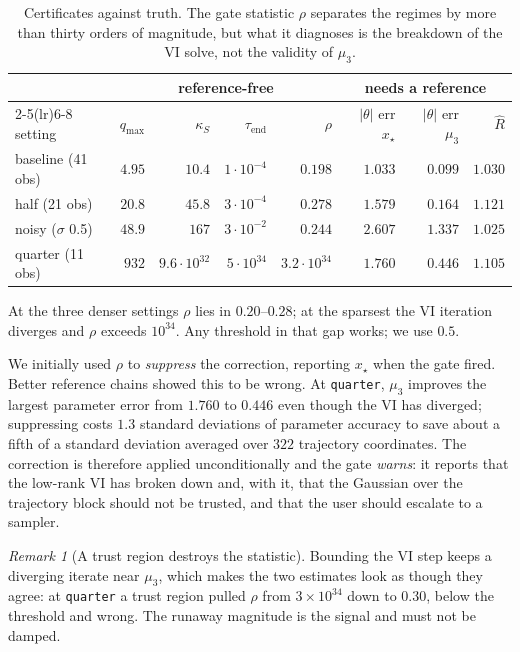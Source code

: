 \documentclass[11pt]{article}
\newcommand{\xmap}{x_{\star}}
\newcommand{\code}[1]{\texttt{\small #1}}
\newcommand{\Rhat}{\widehat{R}}
\theoremstyle{plain}
\theoremstyle{definition}
\theoremstyle{remark}
\newtheorem{remark}{Remark}
\begin{document}
\begin{table}[t]
\centering
\small
\begin{tabular}{lrrrr@{\hskip 1.2em}rrr}
\toprule
& \multicolumn{4}{c}{reference-free} & \multicolumn{3}{c}{needs a reference} \\
\cmidrule(lr){2-5}\cmidrule(lr){6-8}
setting & $q_{\max}$ & $\kappa_S$ & $\tau_{\text{end}}$ & $\rho$
        & $|\theta|$ err $\xmap$ & $|\theta|$ err $\mu_3$ & $\Rhat$ \\
\midrule
baseline (41 obs)   & $4.95$  & $10.4$    & $1{\cdot}10^{-4}$ & $0.198$ & $1.033$ & $0.099$ & $1.030$\\
half (21 obs)       & $20.8$  & $45.8$    & $3{\cdot}10^{-4}$ & $0.278$ & $1.579$ & $0.164$ & $1.121$\\
noisy ($\sigma$ 0.5)& $48.9$  & $167$     & $3{\cdot}10^{-2}$ & $0.244$ & $2.607$ & $1.337$ & $1.025$\\
quarter (11 obs)    & $932$   & $9.6{\cdot}10^{32}$ & $5{\cdot}10^{34}$ & $3.2{\cdot}10^{34}$ & $1.760$ & $0.446$ & $1.105$\\
\bottomrule
\end{tabular}
\caption{Certificates against truth. The gate statistic $\rho$ separates the regimes by more than
thirty orders of magnitude, but what it diagnoses is the breakdown of the VI solve, not the
validity of $\mu_3$.}
\label{tab:certify}
\end{table}

At the three denser settings $\rho$ lies in $0.20$--$0.28$; at the sparsest the VI iteration
diverges and $\rho$ exceeds $10^{34}$. Any threshold in that gap works; we use $0.5$.

We initially used $\rho$ to \emph{suppress} the correction, reporting $\xmap$ when the gate fired.
Better reference chains showed this to be wrong. At \code{quarter}, $\mu_3$ improves the largest
parameter error from $1.760$ to $0.446$ even though the VI has diverged; suppressing costs $1.3$
standard deviations of parameter accuracy to save about a fifth of a standard deviation averaged
over $322$ trajectory coordinates. The correction is therefore applied unconditionally and the gate
\emph{warns}: it reports that the low-rank VI has broken down and, with it, that the Gaussian over
the trajectory block should not be trusted, and that the user should escalate to a sampler.

\begin{remark}[A trust region destroys the statistic]
Bounding the VI step keeps a diverging iterate near $\mu_3$, which makes the two estimates look as
though they agree: at \code{quarter} a trust region pulled $\rho$ from $3\times10^{34}$ down to
$0.30$, below the threshold and wrong. The runaway magnitude is the signal and must not be damped.
\end{remark}
\end{document}
